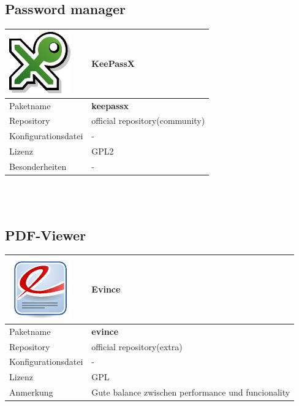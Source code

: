 \subsection{Password manager}
\begin{tabular}{l|l}
\includegraphics[scale=0.75]{keepassx-logo.pdf} & KeePassX \\ \hline
Paketname & \textbf{keepassx} \\ 
Repository & official repository(community) \\
Konfigurationsdatei & - \\
Lizenz & GPL2 \\
Besonderheiten & - \\
\end{tabular}
\\ \\

\subsection{PDF-Viewer}
\begin{tabular}{l|l}
\includegraphics[scale=1]{evince-logo.pdf} & Evince \\ \hline
Paketname & \textbf{evince} \\ 
Repository & official repository(extra) \\
Konfigurationsdatei & - \\
Lizenz & GPL \\
Anmerkung & Gute balance zwischen performance und funcionality \\
\end{tabular}
\\ \\

